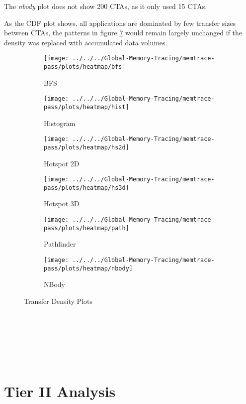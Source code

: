 The \textit{nbody} plot does not show 200 CTAs, as it only used 15 CTAs.

As the CDF plot shows, all applications are dominated by few transfer sizes between CTAs, the patterns in figure \ref{fig:density-plots} would remain largely unchanged if the density was replaced with accumulated data volumes.
\begin{figure}[h!]
	\begin{subfigure}[b]{0.45\textwidth}
		\texttt{[image: ../../../Global-Memory-Tracing/memtrace-pass/plots/heatmap/bfs]}
		\caption{BFS}
		\label{fig:density-bfs}
	\end{subfigure}
	\begin{subfigure}[b]{0.45\textwidth}
		\texttt{[image: ../../../Global-Memory-Tracing/memtrace-pass/plots/heatmap/hist]}
		\caption{Histogram}
		\label{fig:density-hist}
	\end{subfigure}
	\begin{subfigure}[b]{0.45\textwidth}
		\texttt{[image: ../../../Global-Memory-Tracing/memtrace-pass/plots/heatmap/hs2d]}
		\caption{Hotspot 2D}
		\label{fig:density-hs2d}
	\end{subfigure}
	\begin{subfigure}[b]{0.45\textwidth}
		\texttt{[image: ../../../Global-Memory-Tracing/memtrace-pass/plots/heatmap/hs3d]}
		\caption{Hotspot 3D}
		\label{fig:density-hs3d}
	\end{subfigure}
	\begin{subfigure}[b]{0.45\textwidth}
		\texttt{[image: ../../../Global-Memory-Tracing/memtrace-pass/plots/heatmap/path]}
		\caption{Pathfinder}
		\label{fig:density-path}
	\end{subfigure}
	\hfill
	\begin{subfigure}[b]{0.45\textwidth}
		\texttt{[image: ../../../Global-Memory-Tracing/memtrace-pass/plots/heatmap/nbody]}
		\caption{NBody}
		\label{fig:density-nbody}
	\end{subfigure}
	\caption{Transfer Density Plots}
	\label{fig:density-plots}
\end{figure}
\\\\\\\\\
\section{Tier II Analysis}
